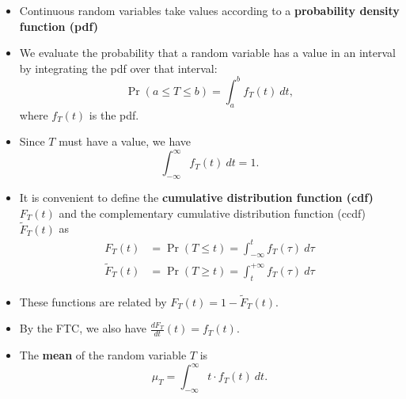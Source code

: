 \begin{SaveDefinition}[key=IntroProbability, title={Introduction to continuous probability}]

\begin{itemize}
	\item Continuous random variables take values according to a \textbf{probability density function (pdf)}
	\item We evaluate the probability that a random variable has a value in an interval by integrating the pdf over that interval:
	\[ \Pr(a \leq T \leq b) = \int_a^b f_T(t) ~dt, \]
	where $f_T(t)$ is the pdf.
	
	\item Since $T$ must have a value, we have
	\[ \int_{-\infty}^{\infty} f_T(t) ~dt = 1.\]
	
\end{itemize}
	
\begin{center}
\end{center}

\begin{itemize}
	\item It is convenient to define the \textbf{cumulative distribution function (cdf)} $F_T(t)$ and the complementary cumulative distribution function (ccdf) $\tilde{F}_T(t)$ as
	\begin{align*}
		F_T(t) & = \Pr(T\leq t) = \int_{-\infty}^t f_T(\tau) ~d\tau \\
		\tilde{F}_T(t) & = \Pr(T\geq t) = \int_t^{+\infty} f_T(\tau) ~d\tau
	\end{align*}

	\item These functions are related by $F_T(t) = 1 - \tilde{F}_T(t)$.
	\item By the FTC, we also have $\frac{dF_T}{dt}(t) = f_T(t)$.
	\item The \textbf{mean} of the random variable $T$ is
		\[ \mu_T = \int_{-\infty}^\infty t \cdot f_T(t) ~dt. \]
\end{itemize}
	
\end{SaveDefinition}


